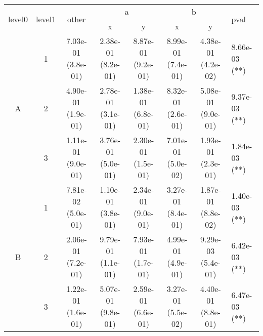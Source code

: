 \begin{tabular}{cccccccl}
\toprule
\multirow{2}{*}{level0} & \multirow{2}{*}{level1}& \multirow{2}{*}{other}&\multicolumn{2}{c}{a}&\multicolumn{2}{c}{b}& \multirow{2}{*}{pval}\tabularnewline
\cmidrule(lr){4-5}
\cmidrule(lr){6-7}
&&&x&y&x&y\tabularnewline
\midrule
\multirow{3}{*}{A}&1& 7.03e-01 (3.8e-01)& 2.38e-01 (8.2e-01)& 8.87e-01 (9.2e-01)& 8.99e-01 (7.4e-01)& 4.38e-01 (4.2e-02)& 8.66e-03 (**)\tabularnewline
&2& 4.90e-01 (1.9e-01)& 2.78e-01 (3.1e-01)& 1.38e-01 (6.8e-01)& 8.32e-01 (2.6e-01)& 5.08e-01 (9.0e-01)& 9.37e-03 (**)\tabularnewline
&3& 1.11e-01 (9.0e-01)& 3.76e-01 (5.0e-01)& 2.30e-01 (1.5e-01)& 7.01e-01 (5.0e-02)& 1.93e-01 (2.3e-01)& 1.84e-03 (**)\tabularnewline
\midrule
\multirow{3}{*}{B}&1& 7.81e-02 (5.0e-01)& 1.10e-01 (3.8e-01)& 2.34e-01 (9.0e-01)& 3.27e-01 (8.4e-01)& 1.87e-01 (8.8e-02)& 1.40e-03 (**)\tabularnewline
&2& 2.06e-01 (7.2e-01)& 9.79e-01 (1.1e-01)& 7.93e-01 (1.7e-01)& 4.99e-01 (4.9e-01)& 9.29e-03 (5.4e-01)& 6.42e-03 (**)\tabularnewline
&3& 1.22e-01 (1.6e-01)& 5.07e-01 (9.8e-01)& 2.59e-01 (6.6e-01)& 3.27e-01 (5.5e-02)& 4.40e-01 (8.8e-01)& 6.47e-03 (**)\tabularnewline
\bottomrule
\end{tabular}
